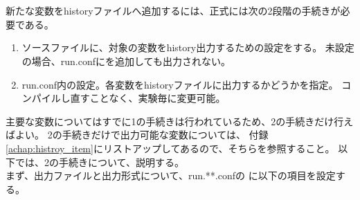 \section{\SecBasicOutputSetting} \label{sec:output}
新たな変数をhistoryファイルへ追加するには、正式には次の2段階の手続きが必要である。

\begin{enumerate}
\item ソースファイルに、対象の変数をhistory出力するための設定をする。
未設定の場合、run.confにを追加しても出力されない。
\item run.conf内の設定。各変数をhistoryファイルに出力するかどうかを指定。
コンパイルし直すことなく、実験毎に変更可能。
\end{enumerate}
主要な変数についてはすでに1の手続きは行われているため、2の手続きだけ行えばよい。
2の手続きだけで出力可能な変数については、
付録\ref{achap:histroy_item}にリストアップしてあるので、そちらを参照すること。
以下では、2の手続きについて、説明する。\\

まず、出力ファイルと出力形式について、run.**.confの
に以下の項目を設定する。\\

\\

